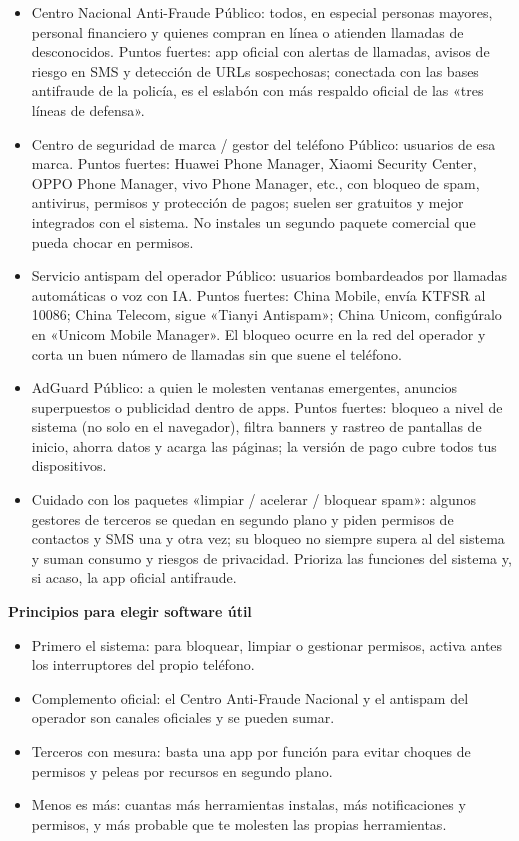 \begin{itemize}
  \item Centro Nacional Anti-Fraude Público: todos, en especial personas mayores, personal financiero y quienes compran en línea o atienden llamadas de desconocidos. Puntos fuertes: app oficial con alertas de llamadas, avisos de riesgo en SMS y detección de URLs sospechosas; conectada con las bases antifraude de la policía, es el eslabón con más respaldo oficial de las «tres líneas de defensa».
  \item Centro de seguridad de marca / gestor del teléfono Público: usuarios de esa marca. Puntos fuertes: Huawei Phone Manager, Xiaomi Security Center, OPPO Phone Manager, vivo Phone Manager, etc., con bloqueo de spam, antivirus, permisos y protección de pagos; suelen ser gratuitos y mejor integrados con el sistema. No instales un segundo paquete comercial que pueda chocar en permisos.
  \item Servicio antispam del operador Público: usuarios bombardeados por llamadas automáticas o voz con IA. Puntos fuertes: China Mobile, envía KTFSR al 10086; China Telecom, sigue «Tianyi Antispam»; China Unicom, configúralo en «Unicom Mobile Manager». El bloqueo ocurre en la red del operador y corta un buen número de llamadas sin que suene el teléfono.
  \item AdGuard Público: a quien le molesten ventanas emergentes, anuncios superpuestos o publicidad dentro de apps. Puntos fuertes: bloqueo a nivel de sistema (no solo en el navegador), filtra banners y rastreo de pantallas de inicio, ahorra datos y acarga las páginas; la versión de pago cubre todos tus dispositivos.
  \item Cuidado con los paquetes «limpiar / acelerar / bloquear spam»: algunos gestores de terceros se quedan en segundo plano y piden permisos de contactos y SMS una y otra vez; su bloqueo no siempre supera al del sistema y suman consumo y riesgos de privacidad. Prioriza las funciones del sistema y, si acaso, la app oficial antifraude.
\end{itemize}

\textbf{Principios para elegir software útil}\par

\begin{itemize}
  \item Primero el sistema: para bloquear, limpiar o gestionar permisos, activa antes los interruptores del propio teléfono.
  \item Complemento oficial: el Centro Anti-Fraude Nacional y el antispam del operador son canales oficiales y se pueden sumar.
  \item Terceros con mesura: basta una app por función para evitar choques de permisos y peleas por recursos en segundo plano.
  \item Menos es más: cuantas más herramientas instalas, más notificaciones y permisos, y más probable que te molesten las propias herramientas.
\end{itemize}

